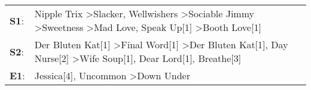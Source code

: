\begin{supertabular}{p{0.03\textwidth}p{0.92\textwidth}}
 \textbf{S1}:  &  Nipple Trix\textsuperscript{} \textgreater \enspace Slacker\textsuperscript{}, \enspace Wellwishers\textsuperscript{} \textgreater \enspace Sociable Jimmy\textsuperscript{} \textgreater \enspace Sweetness\textsuperscript{} \textgreater \enspace Mad Love\textsuperscript{}, \enspace Speak Up[1]\textsuperscript{} \textgreater \enspace Booth Love[1]\textsuperscript{}  \enspace  \\
 \textbf{S2}:  &                                              Der Bluten Kat[1]\textsuperscript{} \textgreater \enspace Final Word[1]\textsuperscript{} \textgreater \enspace Der Bluten Kat[1]\textsuperscript{}, \enspace Day Nurse[2]\textsuperscript{} \textgreater \enspace Wife Soup[1]\textsuperscript{}, \enspace Dear Lord[1]\textsuperscript{}, \enspace Breathe[3]\textsuperscript{}  \enspace  \\
 \textbf{E1}:  &                                                                                                                                                                                                                                                           Jessica[4]\textsuperscript{}, \enspace Uncommon\textsuperscript{} \textgreater \enspace Down Under\textsuperscript{}  \enspace  \\
\end{supertabular}
